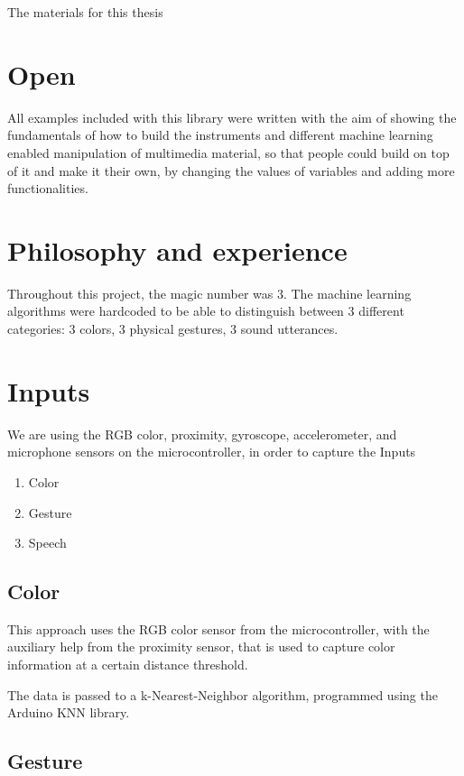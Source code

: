 The materials for this thesis 


\section{Open}

All examples included with this library were written with the aim of showing the fundamentals of how to build the instruments and different machine learning enabled manipulation of multimedia material, so that people could build on top of it and make it their own, by changing the values of variables and adding more functionalities.

\section{Philosophy and experience}

Throughout this project, the magic number was 3. The machine learning algorithms were hardcoded to be able to distinguish between 3 different categories: 3 colors, 3 physical gestures, 3 sound utterances.

\section{Inputs}

We are using the RGB color, proximity, gyroscope, accelerometer, and microphone sensors on the microcontroller, in order to capture the Inputs

\begin{enumerate}
  \item Color
  \item Gesture
  \item Speech
\end{enumerate}

\subsection{Color}

This approach uses the RGB color sensor from the microcontroller, with the auxiliary help from the proximity sensor, that is used to capture color information at a certain distance threshold.

The data is passed to a k-Nearest-Neighbor algorithm, programmed using the Arduino KNN library.

\subsection{Gesture}

